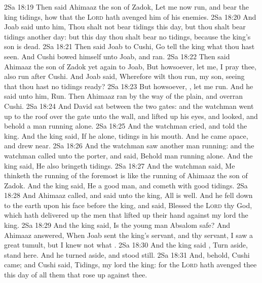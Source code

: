 \vs 2Sa 18:19 Then said Ahimaaz the son of Zadok, Let me now run, and bear the king tidings, how that the \textsc{Lord} hath avenged him of his enemies.
\vs 2Sa 18:20 And Joab said unto him, Thou shalt not bear tidings this day, but thou shalt bear tidings another day: but this day thou shalt bear no tidings, because the king's son is dead.
\vs 2Sa 18:21 Then said Joab to Cushi, Go tell the king what thou hast seen. And Cushi bowed himself unto Joab, and ran.
\vs 2Sa 18:22 Then said Ahimaaz the son of Zadok yet again to Joab, But howsoever, let me, I pray thee, also run after Cushi. And Joab said, Wherefore wilt thou run, my son, seeing that thou hast no tidings ready?
\vs 2Sa 18:23 But howsoever, , let me run. And he said unto him, Run. Then Ahimaaz ran by the way of the plain, and overran Cushi.
\vs 2Sa 18:24 And David sat between the two gates: and the watchman went up to the roof over the gate unto the wall, and lifted up his eyes, and looked, and behold a man running alone.
\vs 2Sa 18:25 And the watchman cried, and told the king. And the king said, If he  alone,  tidings in his mouth. And he came apace, and drew near.
\vs 2Sa 18:26 And the watchman saw another man running: and the watchman called unto the porter, and said, Behold  man running alone. And the king said, He also bringeth tidings.
\vs 2Sa 18:27 And the watchman said, Me thinketh the running of the foremost is like the running of Ahimaaz the son of Zadok. And the king said, He  a good man, and cometh with good tidings.
\vs 2Sa 18:28 And Ahimaaz called, and said unto the king, All is well. And he fell down to the earth upon his face before the king, and said, Blessed  the \textsc{Lord} thy God, which hath delivered up the men that lifted up their hand against my lord the king.
\vs 2Sa 18:29 And the king said, Is the young man Absalom safe? And Ahimaaz answered, When Joab sent the king's servant, and  thy servant, I saw a great tumult, but I knew not what .
\vs 2Sa 18:30 And the king said , Turn aside,  stand here. And he turned aside, and stood still.
\vs 2Sa 18:31 And, behold, Cushi came; and Cushi said, Tidings, my lord the king: for the \textsc{Lord} hath avenged thee this day of all them that rose up against thee.
